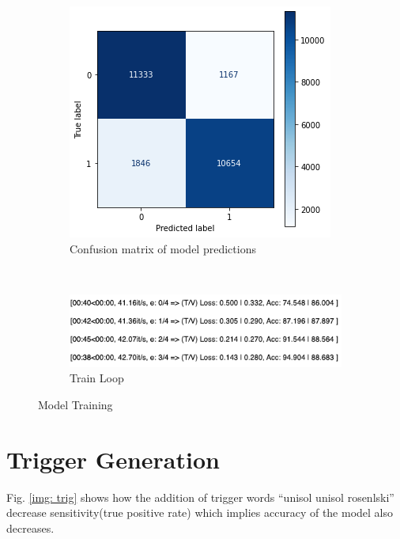 \documentclass[12pt]{report}
\begin{document}
\begin{spacing}{1.5}
\begin{figure}[ht!]
    \centering
    \begin{subfigure}[t]{0.3\textwidth}
        \centering
        \includegraphics[width=\linewidth]{./img/output/cm_og.png}
        \caption{Confusion matrix of model predictions}
        \label{cm_og}
    \end{subfigure}%
    ~ 
    \begin{subfigure}[t]{0.5\textwidth}
        \centering
        \includegraphics[width=\linewidth]{./img/output/train_loop.png}
        \caption{Train Loop}
    \end{subfigure}
    \caption{Model Training}
 \end{figure}

\section{Trigger Generation}
Fig. \ref{img: trig} shows how the addition of trigger words ``unisol unisol rosenlski'' decrease sensitivity(true positive rate) which implies accuracy of the model also decreases.


\end{spacing}
\end{document}

